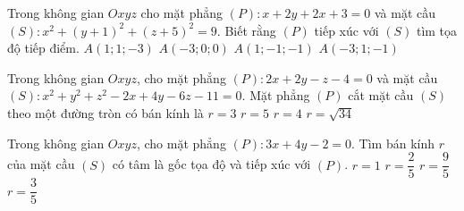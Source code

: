 \begin{ex}%
	Trong không gian $Oxyz$ cho mặt phẳng $(P)\colon x+2y+2x+3=0$ và mặt cầu $(S)\colon x^2+(y+1)^2+(z+5)^2=9$. Biết rằng $(P)$ tiếp xúc với $(S)$ tìm tọa độ tiếp điểm.
	\choice
	{\True $A(1;1;-3)$}
	{$A(-3;0;0)$}
	{$A(1;-1;-1)$}
	{$A(-3;1;-1)$}
\end{ex}
\begin{ex}%
	Trong không gian $Oxyz$, cho mặt phẳng $(P)\colon 2x+2y-z-4=0$ và mặt cầu $(S)\colon x^2+y^2+z^2-2x+4y-6z-11=0$. Mặt phẳng $(P)$ cắt mặt cầu $(S)$ theo một đường tròn có bán kính là
	\choice
	{$r=3$}
	{$r=5$}
	{\True $r=4$}
	{$r=\sqrt{34}$}
\end{ex}
\begin{ex}%
	Trong không gian $Oxyz$, cho mặt phẳng $(P)\colon 3x+4y-2=0$. Tìm bán kính $r$ của mặt cầu $(S)$ có tâm là gốc tọa độ và tiếp xúc với $(P)$.
	\choice
	{$r=1$}
	{\True $r=\dfrac{2}{5}$}
	{$r=\dfrac{9}{5}$}
	{$r=\dfrac{3}{5}$}
\end{ex}


